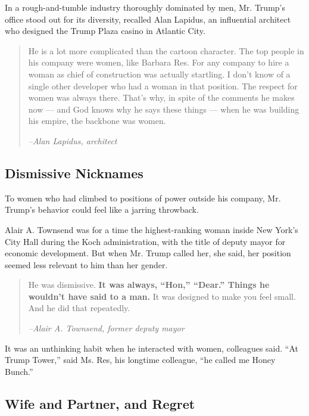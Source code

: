 In a rough-and-tumble industry thoroughly dominated by men, Mr. Trump's
office stood out for its diversity, recalled Alan Lapidus, an
influential architect who designed the Trump Plaza casino in Atlantic
City.

\begin{quote}
He is a lot more complicated than the cartoon character. The top people
in his company were women, like Barbara Res. For any company to hire a
woman as chief of construction was actually startling. I don't know of a
single other developer who had a woman in that position. The respect for
women was always there. That's why, in spite of the comments he makes
now --- and God knows why he says these things --- when he was building
his empire, the backbone was women.

\emph{--Alan Lapidus, architect}
\end{quote}

\hypertarget{dismissive-nicknames}{%
\subsection{Dismissive Nicknames}\label{dismissive-nicknames}}

To women who had climbed to positions of power outside his company, Mr.
Trump's behavior could feel like a jarring throwback.

Alair A. Townsend was for a time the highest-ranking woman inside New
York's City Hall during the Koch administration, with the title of
deputy mayor for economic development. But when Mr. Trump called her,
she said, her position seemed less relevant to him than her gender.

\begin{quote}
He was dismissive. \textbf{It was always, ``Hon,'' ``Dear.'' Things he
wouldn't have said to a man.} It was designed to make you feel small.
And he did that repeatedly.

\emph{--Alair A. Townsend, former deputy mayor}
\end{quote}

It was an unthinking habit when he interacted with women, colleagues
said. ``At Trump Tower,'' said Ms. Res, his longtime colleague, ``he
called me Honey Bunch.''

\hypertarget{wife-and-partner-and-regret}{%
\subsection{Wife and Partner, and
Regret}\label{wife-and-partner-and-regret}}

